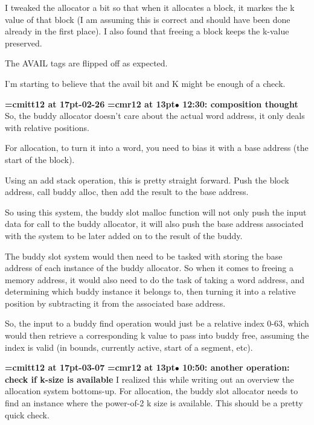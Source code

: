 I tweaked the allocator a bit so that when it allocates a block, it markes the k value of that block (I am assuming this is correct and should have been done already in the first place). I also found that freeing a block keeps the k-value preserved.
\par

The AVAIL tags are flipped off as expected.
\par

I'm starting to believe that the avail bit and K might be enough of a check.
\par

{\medskip\noindent\bf\font\titlefont=cmitt12 at 17pt-02-26}\medskip
{\smallskip\noindent\bf\font\titlefont=cmr12 at 13pt\titlefont $\bullet$ 12:30: composition thought }\smallskip
So, the buddy allocator doesn't care about the actual word address, it only deals with relative positions.
\par

For allocation, to turn it into a word, you need to bias it with a base address (the start of the block).
\par

Using an add stack operation, this is pretty straight forward. Push the block address, call buddy alloc, then add the result to the base address.
\par

So using this system, the buddy slot malloc function will not only push the input data for call to the buddy allocator, it will also push the base address associated with the system to be later added on to the result of the buddy.
\par

The buddy slot system would then need to be tasked with storing the base address of each instance of the buddy allocator. So when it comes to freeing a memory address, it would also need to do the task of taking a word address, and determining which buddy instance it belongs to, then turning it into a relative position by subtracting it from the associated base address.
\par

So, the input to a buddy find operation would just be a relative index 0-63, which would then retrieve a corresponding k value to pass into buddy free, assuming the index is valid (in bounds, currently active, start of a segment, etc).
\par

{\medskip\noindent\bf\font\titlefont=cmitt12 at 17pt-03-07}\medskip
{\smallskip\noindent\bf\font\titlefont=cmr12 at 13pt\titlefont $\bullet$ 10:50: another operation: check if k-size is available}\smallskip
I realized this while writing out an overview the allocation system bottoms-up. For allocation, the buddy slot allocator needs to find an instance where the power-of-2 k size is available. This should be a pretty quick check.
\par

